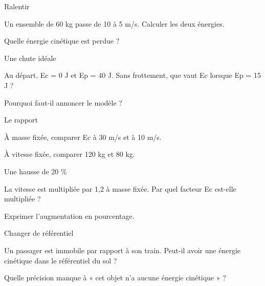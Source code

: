 \par\noindent\begin{minipage}{\linewidth}
\begin{exercice}[2]{Ralentir}
\begin{questions}
\item Un ensemble de 60 kg passe de 10 à 5 m/s. Calculer les deux énergies.
\item Quelle énergie cinétique est perdue ?
\end{questions}
\end{exercice}
\end{minipage}
\par\noindent\begin{minipage}{\linewidth}
\begin{exercice}[2]{Une chute idéale}
\begin{questions}
\item Au départ, Ec = 0 J et Ep = 40 J. Sans frottement, que vaut Ec lorsque Ep = 15 J ?
\item Pourquoi faut-il annoncer le modèle ?
\end{questions}
\end{exercice}
\end{minipage}
\par\noindent\begin{minipage}{\linewidth}
\begin{exercice}[2]{Le rapport}
\begin{questions}
\item À masse fixée, comparer Ec à 30 m/s et à 10 m/s.
\item À vitesse fixée, comparer 120 kg et 80 kg.
\end{questions}
\end{exercice}
\end{minipage}
\clearpage{}
\par\noindent\begin{minipage}{\linewidth}
\begin{exercice}[3]{Une hausse de 20 \%}
\begin{questions}
\item La vitesse est multipliée par 1,2 à masse fixée. Par quel facteur Ec est-elle multipliée ?
\item Exprimer l’augmentation en pourcentage.
\end{questions}
\end{exercice}
\end{minipage}
\par\noindent\begin{minipage}{\linewidth}
\begin{exercice}[3]{Changer de référentiel}
\begin{questions}
\item Un passager est immobile par rapport à son train. Peut-il avoir une énergie cinétique dans le référentiel du sol ?
\item Quelle précision manque à « cet objet n’a aucune énergie cinétique » ?
\end{questions}
\end{exercice}
\end{minipage}
